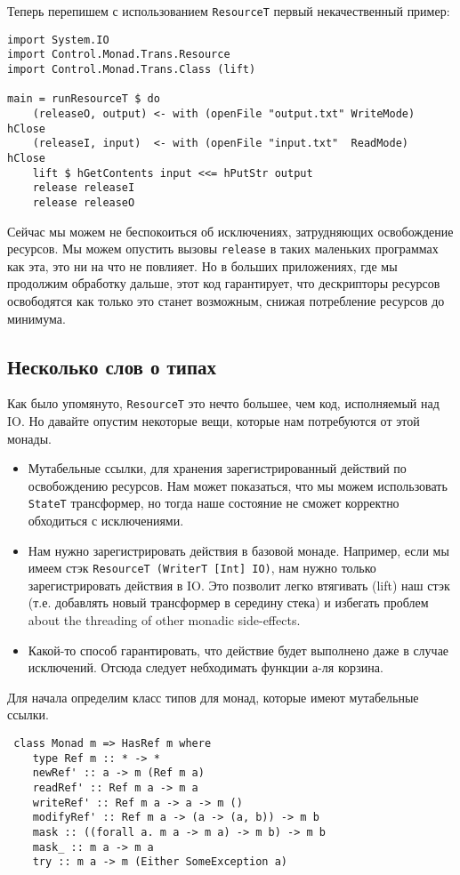 Теперь перепишем с использованием \lstinline'ResourceT' первый некачественный пример:
\begin{lstlisting}
import System.IO
import Control.Monad.Trans.Resource
import Control.Monad.Trans.Class (lift)

main = runResourceT $ do
    (releaseO, output) <- with (openFile "output.txt" WriteMode) hClose
    (releaseI, input)  <- with (openFile "input.txt"  ReadMode)  hClose
    lift $ hGetContents input <<= hPutStr output
    release releaseI
    release releaseO
\end{lstlisting}

Сейчас мы можем не беспокоиться об исключениях, затрудняющих освобождение ресурсов. Мы
можем опустить вызовы \verb=release= в таких маленьких программах как эта, это ни на что
не повлияет. Но в больших приложениях, где мы продолжим обработку дальше, этот код
гарантирует, что дескрипторы ресурсов освободятся как только это станет возможным, снижая
потребление ресурсов до минимума.

\subsection{Несколько слов о типах}

Как было упомянуто, \lstinline'ResourceT' это нечто большее, чем код, исполняемый над IO.
Но давайте опустим некоторые вещи, которые нам потребуются от этой монады.
\begin{itemize}
\item Мутабельные ссылки, для хранения зарегистрированный действий по освобождению
ресурсов. Нам может показаться, что мы можем использовать \lstinline'StateT' трансформер,
но тогда наше состояние не сможет корректно обходиться с исключениями.
\item Нам нужно зарегистрировать действия в базовой монаде. Например, если мы имеем 
стэк \lstinline'ResourceT (WriterT [Int] IO)', нам нужно только зарегистрировать
действия в IO. Это позволит легко втягивать (lift) наш стэк (т.е. добавлять новый
трансформер в середину стека) и избегать проблем about the
threading of other monadic side-effects.
\item Какой-то способ гарантировать, что действие будет выполнено даже в случае
исключений. Отсюда следует небходимать функции а-ля корзина.
\end{itemize}

Для начала определим класс типов для монад, которые имеют мутабельные ссылки.
\begin{lstlisting}
 class Monad m => HasRef m where
    type Ref m :: * -> *
    newRef' :: a -> m (Ref m a)
    readRef' :: Ref m a -> m a
    writeRef' :: Ref m a -> a -> m ()
    modifyRef' :: Ref m a -> (a -> (a, b)) -> m b
    mask :: ((forall a. m a -> m a) -> m b) -> m b
    mask_ :: m a -> m a
    try :: m a -> m (Either SomeException a)
\end{lstlisting}

